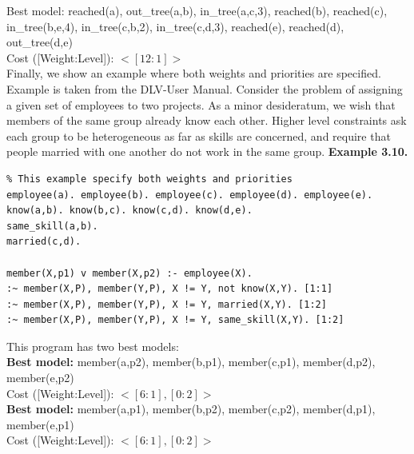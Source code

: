\documentclass[14pt,a4paper, titlepage]{article}
\begin{document}
Best model: {reached(a), out\_tree(a,b), in\_tree(a,c,3), reached(b), reached(c), in\_tree(b,e,4), in\_tree(c,b,2), in\_tree(c,d,3), reached(e), reached(d), out\_tree(d,e)}
\\Cost ([Weight:Level]): $<[12:1]>$
\\Finally, we show an example where both weights and priorities are specified. Example is taken from the DLV-User Manual\cite{dlvum}. Consider the problem of assigning a given set of employees to two projects. As a minor desideratum, we wish that members of the same group already know each other. Higher level constraints ask each group to be heterogeneous as far as skills are concerned, and require that people married with one another do not work in the same group.
\newpage 
\textbf{Example 3.10.}
\begin{lstlisting}
% This example specify both weights and priorities
employee(a). employee(b). employee(c). employee(d). employee(e).
know(a,b). know(b,c). know(c,d). know(d,e).
same_skill(a,b).
married(c,d).

member(X,p1) v member(X,p2) :- employee(X).
:~ member(X,P), member(Y,P), X != Y, not know(X,Y). [1:1]
:~ member(X,P), member(Y,P), X != Y, married(X,Y). [1:2]
:~ member(X,P), member(Y,P), X != Y, same_skill(X,Y). [1:2] 
\end{lstlisting}
This program has two best models:
\\ \textbf{Best model: }{member(a,p2), member(b,p1), member(c,p1), member(d,p2), member(e,p2)}
\\Cost ([Weight:Level]): $<[6:1],[0:2]>$
\\ \textbf{Best model: }{member(a,p1), member(b,p2), member(c,p2), member(d,p1), member(e,p1)}
\\Cost ([Weight:Level]): $<[6:1],[0:2]>$
\end{document}
